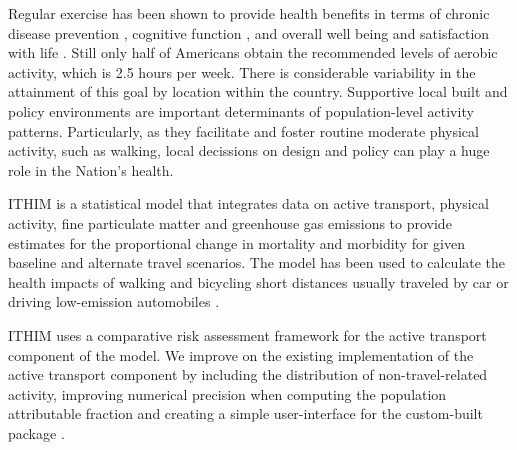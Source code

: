 Regular exercise has been shown to provide health benefits in terms of
chronic disease prevention \cite{warburton2006}, cognitive function
\cite{hillman2008}, and overall well being and satisfaction with life
\cite{maher2013}. Still only half of Americans obtain the recommended
levels of aerobic activity, which is 2.5 hours per week. There is
considerable variability in the attainment of this goal by location
within the country. Supportive local built and policy environments are
important determinants of population-level activity
patterns. Particularly, as they facilitate and foster routine moderate
physical activity, such as walking, local decissions on design and
policy can play a huge role in the Nation's health.


ITHIM is a statistical model that integrates data on active transport,
physical activity, fine particulate matter and greenhouse gas
emissions to provide estimates for the proportional change in
mortality and morbidity for given baseline and alternate travel
scenarios. The model has been used to calculate the health impacts of
walking and bicycling short distances usually traveled by car or
driving low-emission automobiles \cite{woodcock2013,maizlish2013}.

ITHIM uses a comparative risk assessment framework for the active
transport component of the model.  We improve on the existing
implementation of the active transport component by including the
distribution of non-travel-related activity, improving numerical
precision when computing the population attributable fraction and
creating a simple user-interface for the custom-built \R{}
package \package{}.
